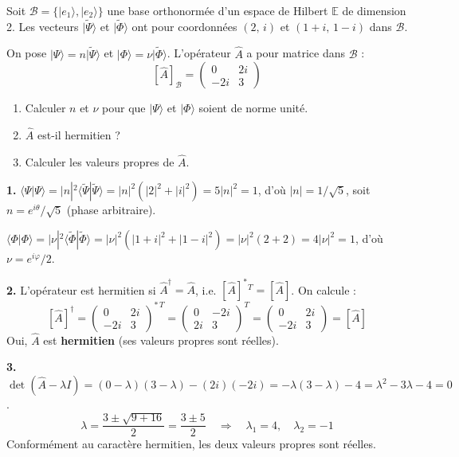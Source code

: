 \documentclass[12pt,a4paper]{article}
\begin{document}
\begin{boiteexercice}
Soit $\mathcal{B} = \{|e_1\rangle, |e_2\rangle\}$ une base orthonormée d'un espace de Hilbert $\mathbb{E}$ de dimension 2. Les vecteurs $|\tilde{\Psi}\rangle$ et $|\tilde{\Phi}\rangle$ ont pour coordonnées $(2,\,i)$ et $(1+i,\,1-i)$ dans $\mathcal{B}$.

On pose $|\Psi\rangle = n|\tilde{\Psi}\rangle$ et $|\Phi\rangle = \nu|\tilde{\Phi}\rangle$. L'opérateur $\hat{A}$ a pour matrice dans $\mathcal{B}$ :
\[
[\hat{A}]_\mathcal{B} = \begin{pmatrix} 0 & 2i \\ -2i & 3 \end{pmatrix}
\]
\begin{enumerate}
  \item Calculer $n$ et $\nu$ pour que $|\Psi\rangle$ et $|\Phi\rangle$ soient de norme unité.
  \item $\hat{A}$ est-il hermitien ?
  \item Calculer les valeurs propres de $\hat{A}$.
\end{enumerate}
\end{boiteexercice}

\begin{boitecorrige}
\textbf{1.} $\langle\Psi|\Psi\rangle = |n|^2\langle\tilde{\Psi}|\tilde{\Psi}\rangle = |n|^2(|2|^2+|i|^2) = 5|n|^2 = 1$, d'où $|n| = 1/\sqrt{5}$, soit $\boxed{n = e^{i\theta}/\sqrt{5}}$ (phase arbitraire).

$\langle\Phi|\Phi\rangle = |\nu|^2\langle\tilde{\Phi}|\tilde{\Phi}\rangle = |\nu|^2(|1+i|^2+|1-i|^2) = |\nu|^2(2+2) = 4|\nu|^2 = 1$, d'où $\boxed{\nu = e^{i\varphi}/2}$.

\textbf{2.} L'opérateur est hermitien si $\hat{A}^\dagger = \hat{A}$, i.e. $[\hat{A}]^* {}^T = [\hat{A}]$. On calcule :
\[
[\hat{A}]^\dagger = \begin{pmatrix} 0 & 2i \\ -2i & 3 \end{pmatrix}^{*\,T} = \begin{pmatrix} 0 & -2i \\ 2i & 3 \end{pmatrix}^T = \begin{pmatrix} 0 & 2i \\ -2i & 3 \end{pmatrix} = [\hat{A}]
\]
Oui, $\hat{A}$ est \textbf{hermitien} (ses valeurs propres sont réelles).

\textbf{3.} $\det(\hat{A} - \lambda I) = (0-\lambda)(3-\lambda) - (2i)(-2i) = -\lambda(3-\lambda) - 4 = \lambda^2 - 3\lambda - 4 = 0$.
\[
\lambda = \frac{3\pm\sqrt{9+16}}{2} = \frac{3\pm5}{2} \quad\Rightarrow\quad \boxed{\lambda_1 = 4,\quad \lambda_2 = -1}
\]
Conformément au caractère hermitien, les deux valeurs propres sont réelles.
\end{boitecorrige}
\end{document}
